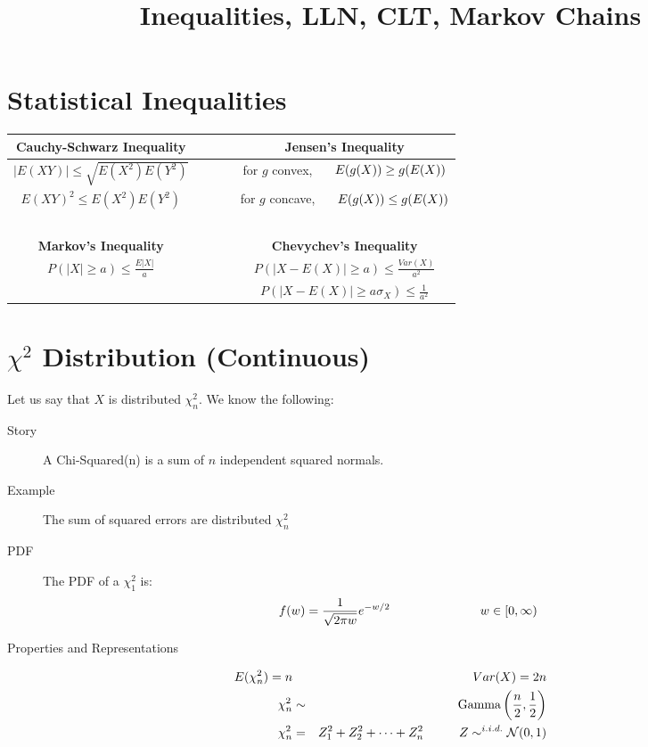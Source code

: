 \documentclass[11.5pt]{article}
\title{Inequalities, LLN, CLT, Markov Chains}
\author{\justin}
\begin{document}
\maketitle

\begin{notes}

\section*{Statistical Inequalities}

\begin{table}[htb!]
   \centering
   \setlength{\extrarowheight}{3pt}
	\begin{tabular}{cccc}
	\textbf{Cauchy-Schwarz Inequality} & ~ & ~ & \textbf{Jensen's Inequality} \\
	\midrule
	$|E(XY)| \leq \sqrt{E(X^2)E(Y^2)}$ & ~ & ~ & for $g$ convex, $\hspace{.5 cm} E(g(X)) \geq g(E(X))$ \\
	$E(XY)^2 \leq E\left(X^2\right)E\left(Y^2\right)$ & ~ & ~ & for $g$ concave, $\hspace{.5 cm} E(g(X)) \leq g(E(X))$ \\
	~ & ~ & ~ & ~ \\
	\textbf{Markov's Inequality} & ~ & ~ & \textbf{Chevychev's Inequality} \\
	\midrule
	$P(|X| \geq a) \leq \frac{E|X|}{a}$ & ~ & ~ & $P(|X - E(X)| \geq a) \leq \frac{Var(X)}{a^2}$ \\
	~ & ~ & ~ & $P(|X - E(X)| \geq a\sigma_X) \leq \frac{1}{a^2}$ \\
	\end{tabular}
\end{table}

\section*{$\chi^2$ Distribution (Continuous)}
Let us say that $X$ is distributed $\chi^2_n$. We know the following:
\begin{description}
	\item[Story] A Chi-Squared(n) is a sum of $n$ independent squared normals.
	\item[Example]	The sum of squared errors are distributed $\chi^2_n$
	\item[PDF] The PDF of a $\chi^2_1$ is:
\begin{eqnarray*}
f(w) = \frac{1}{\sqrt{2\pi w}}e^{-w/2}
\hspace{1 in}
w \in [0, \infty)
\end{eqnarray*}
	\item[Properties and Representations]
\end{description}
\vspace{-.4 cm}
	\begin{eqnarray*}
		E(\chi^2_n) = n && Var(X) = 2n \\
		\chi_n^2 &\sim& \textrm{Gamma}\left(\frac{n}{2}, \frac{1}{2}\right) \\
		\chi_n^2 &=& Z_1^2 + Z_2^2 + \dots + Z_n^2 \hspace{1 cm} Z \sim^{i.i.d.} \mathcal{N}(0, 1)
	\end{eqnarray*}


\end{notes}
\end{document}
